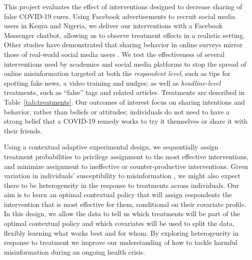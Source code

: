 \documentclass[letterpaper, 12pt, parskip=full,DIV=10]{scrartcl}
\begin{document}
This project evaluates the effect of interventions designed to decrease sharing of false COVID-19 cures. Using Facebook advertisements to recruit social media users in Kenya and Nigeria, we deliver our interventions with a Facebook Messenger chatbot, allowing us to observe treatment effects in a realistic setting. Other studies have demonstrated that sharing behavior in online surveys mirror those of real-world social media users \citep{mosleh2020self}. We test the effectiveness of several interventions used by academics and social media platforms to stop the spread of online misinformation targeted at both the \textit{respondent level}, such as tips for spotting fake news, a video training and nudges; as well as \textit{headline-level} treatments, such as ``false'' tags and related articles. Treatments are described in Table~\ref{tab:treatments}. Our outcomes of interest focus on sharing intentions and behavior, rather than beliefs or attitudes; individuals do not need to have a strong belief that a COVID-19 remedy works to try it themselves or share it with their friends.


Using a contextual adaptive experimental design, we sequentially assign treatment probabilities to privilege assignment to the most effective interventions, and minimize assignment to ineffective or counter-productive interventions. Given variation in individuals' susceptibility to misinformation \citep{wittenberg2020misinformation}, we might also expect there to be heterogeneity in the response to treatments across individuals. Our aim is to learn an optimal contextual policy that will assign respondents the intervention that is most effective for them, conditional on their covariate profile. In this design, we allow the data to tell us which treatments will be part of the optimal contextual policy and which covariates will be used to split the data, flexibly learning what works best and for whom. By exploring heterogeneity in response to treatment we improve our understanding of how to tackle harmful misinformation during an ongoing health crisis. 
\end{document}
